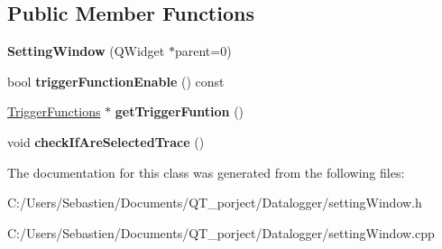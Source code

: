 \subsection*{Public Member Functions}
\begin{DoxyCompactItemize}
\item 
\mbox{\label{class_setting_window_ac8848b08b28320174d3057676b9f3bd9}} 
{\bfseries Setting\+Window} (Q\+Widget $\ast$parent=0)
\item 
\mbox{\label{class_setting_window_a4c72394df3b0d7a59035b1f6c2b5765d}} 
bool {\bfseries trigger\+Function\+Enable} () const
\item 
\mbox{\label{class_setting_window_a131160f6b1b9960cce9669070533db10}} 
\hyperlink{class_trigger_functions}{Trigger\+Functions} $\ast$ {\bfseries get\+Trigger\+Funtion} ()
\item 
\mbox{\label{class_setting_window_a43e7f408e29218f28fcbea1f039701a6}} 
void {\bfseries check\+If\+Are\+Selected\+Trace} ()
\end{DoxyCompactItemize}


The documentation for this class was generated from the following files\+:\begin{DoxyCompactItemize}
\item 
C\+:/\+Users/\+Sebastien/\+Documents/\+Q\+T\+\_\+porject/\+Datalogger/setting\+Window.\+h\item 
C\+:/\+Users/\+Sebastien/\+Documents/\+Q\+T\+\_\+porject/\+Datalogger/setting\+Window.\+cpp\end{DoxyCompactItemize}
